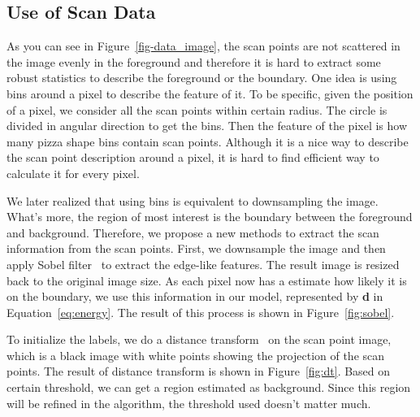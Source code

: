 \documentclass{article} %
\begin{document}
\subsection{Use of Scan Data}

As you can see in Figure~\ref{fig-data_image}, the scan points are not
scattered in the image evenly in the foreground and therefore it is
hard to extract some robust statistics to describe the foreground or
the boundary. One idea is using bins around a pixel to describe the
feature of it. To be specific, given the position of a pixel, we
consider all the scan points within certain radius. The circle is
divided in angular direction to get the bins. Then the feature of the
pixel is how many pizza shape bins contain scan points. Although it is
a nice way to describe the scan point description around a pixel, it
is hard to find efficient way to calculate it for every
pixel.

We later realized that using bins is equivalent to downsampling the
image. What's more, the region of most interest is the boundary
between the foreground and background. Therefore, we propose a new
methods to extract the scan information from the scan points. First,
we downsample the image and then apply Sobel
filter~\citep{Szeliski2010} to extract the edge-like features. The
result image is resized back to the original image size. As each pixel
now has a estimate how likely it is on the boundary, we use this
information in our model, represented by \textbf{d} in
Equation~\eqref{eq:energy}. The result of this process is shown in
Figure~\ref{fig:sobel}.

To initialize the labels, we do a distance
transform~\citep{Borgefors1986Distance,Felzenszwalb2004Distance} on
the scan point image, which is a black image with white points showing
the projection of the scan points. The result of distance transform is
shown in Figure~\ref{fig:dt}. Based on certain threshold, we can
get a region estimated as background. Since this region will be
refined in the algorithm, the threshold used doesn't matter much.
\end{document}
